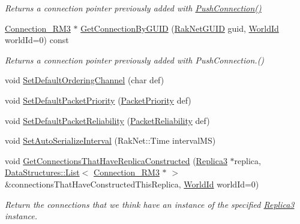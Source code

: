 \begin{DoxyCompactItemize}
\begin{DoxyCompactList}\small\item\em Returns a connection pointer previously added with \hyperlink{class_rak_net_1_1_replica_manager3_a5497b1ce378391cd617cec81ce7d8b94}{Push\-Connection()} \end{DoxyCompactList}\item 
\hyperlink{class_rak_net_1_1_connection___r_m3}{Connection\-\_\-\-R\-M3} $\ast$ \hyperlink{class_rak_net_1_1_replica_manager3_af43d3d10f0369d38a481090a6609a48f}{Get\-Connection\-By\-G\-U\-I\-D} (\hyperlink{struct_rak_net_1_1_rak_net_g_u_i_d}{Rak\-Net\-G\-U\-I\-D} guid, \hyperlink{group___r_e_p_l_i_c_a___m_a_n_a_g_e_r___g_r_o_u_p3_ga44b59af8e882248f61aa41d8ace38bf7}{World\-Id} world\-Id=0) const 
\begin{DoxyCompactList}\small\item\em Returns a connection pointer previously added with Push\-Connection.() \end{DoxyCompactList}\item 
void \hyperlink{class_rak_net_1_1_replica_manager3_a7e01d9098c06ad5c9eac71506fad6b13}{Set\-Default\-Ordering\-Channel} (char def)
\item 
void \hyperlink{class_rak_net_1_1_replica_manager3_afcbcfde423edca9e386f59c2f054e753}{Set\-Default\-Packet\-Priority} (\hyperlink{_packet_priority_8h_a659378374e516180f93640c79f59705c}{Packet\-Priority} def)
\item 
void \hyperlink{class_rak_net_1_1_replica_manager3_a3909030c3ad377e9b2ac1afc0e78889f}{Set\-Default\-Packet\-Reliability} (\hyperlink{_packet_priority_8h_ae41fa01235e99dced384d137fa874a7e}{Packet\-Reliability} def)
\item 
void \hyperlink{class_rak_net_1_1_replica_manager3_a06af43f52ae3148e763ad9223c308639}{Set\-Auto\-Serialize\-Interval} (Rak\-Net\-::\-Time interval\-M\-S)
\item 
void \hyperlink{class_rak_net_1_1_replica_manager3_a9b87ac17416a6f00452a13f8279523e3}{Get\-Connections\-That\-Have\-Replica\-Constructed} (\hyperlink{class_rak_net_1_1_replica3}{Replica3} $\ast$replica, \hyperlink{class_data_structures_1_1_list}{Data\-Structures\-::\-List}$<$ \hyperlink{class_rak_net_1_1_connection___r_m3}{Connection\-\_\-\-R\-M3} $\ast$ $>$ \&connections\-That\-Have\-Constructed\-This\-Replica, \hyperlink{group___r_e_p_l_i_c_a___m_a_n_a_g_e_r___g_r_o_u_p3_ga44b59af8e882248f61aa41d8ace38bf7}{World\-Id} world\-Id=0)
\begin{DoxyCompactList}\small\item\em Return the connections that we think have an instance of the specified \hyperlink{class_rak_net_1_1_replica3}{Replica3} instance. \end{DoxyCompactList}\item 

\end{DoxyCompactItemize}
